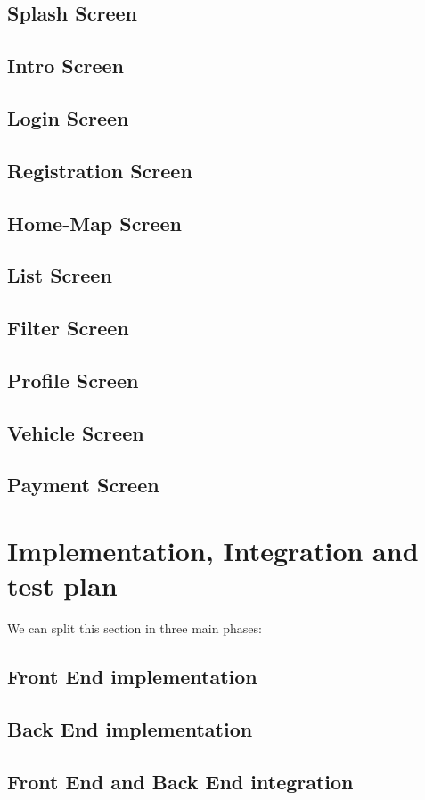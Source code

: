 \documentclass[11pt]{article} %
\begin{document}
\subsection{Splash Screen}
\subsection{Intro Screen}
\subsection{Login Screen}
\subsection{Registration Screen}
\subsection{Home-Map Screen}
\subsection{List Screen}
\subsection{Filter Screen}
\subsection{Profile Screen}
\subsection{Vehicle Screen}
\subsection{Payment Screen}

\section{Implementation, Integration and test plan}
We can split this section in three main phases: 
\subsection{Front End implementation}
\subsection{Back End implementation}
\subsection{Front End and Back End integration}
\end{document}
